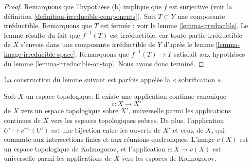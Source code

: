 \begin{proof}
Remarquons que l'hypothèse (b) implique que $f$ est surjective (voir la
définition \ref{definition-irreducible-components}).
Soit $T \subset Y$ une composante irréductible.
Remarquons que $T$ est fermée ; voir le lemme \ref{lemma-irreducible}.
Le lemme résulte du fait que $f^{-1}(T)$ est irréductible, car toute partie
irréductible de $X$ s'envoie dans une composante irréductible de $Y$ d'après
le lemme \ref{lemma-image-irreducible-space}.
Remarquons que $f^{-1}(T) \to T$ satisfait aux hypothèses du
lemme \ref{lemma-irreducible-on-top}. Nous avons donc terminé.
\end{proof}

\noindent
La construction du lemme suivant est parfois appelée la « sobrification ».

\begin{lemma}
\label{lemma-make-sober}
\begin{reference}
\cite[p. 68 et suiv.]{EGA1-second}
\end{reference}
Soit $X$ un espace topologique. Il existe une application continue canonique
$$
c : X \longrightarrow X'
$$
de $X$ vers un espace topologique sobre $X'$, universelle parmi les
applications continues de $X$ vers les espaces topologiques sobres.
De plus, l'application $U' \mapsto c^{-1}(U')$ est une bijection entre les
ouverts de $X'$ et ceux de $X$, qui commute aux intersections finies et aux
réunions quelconques. L'image $c(X)$ est un espace topologique de Kolmogorov,
et l'application $c : X \to c(X)$ est universelle parmi les applications de
$X$ vers les espaces de Kolmogorov.
\end{lemma}

